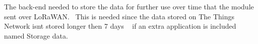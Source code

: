 The back-\/end needed to store the data for further use over time that the module sent over Lo\+Ra\+W\+AN.~\newline
This is needed since the data stored on The Things Network isn\textquotesingle{}t stored longer then 7 days ~\newline
 if an extra application is included named Storage data. ~\newline
